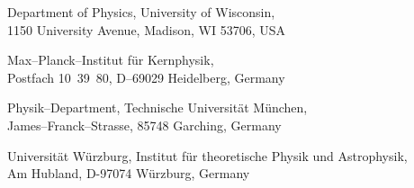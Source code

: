 \documentclass[12pt,a4paper]{article}
\newcommand{\GLOBES}{{\sf GLoBES}}
\newcommand{\GLOBESN}{{\sf GLoBES~3.0}}
\begin{document}
\begin{titlepage}
{\begin{center}
\footnotemark[1]%
       Department of Physics, University of Wisconsin, \\
       1150 University Avenue, Madison, WI 53706, USA

\vspace*{1mm}

\footnotemark[2]%
       Max--Planck--Institut f\"ur Kernphysik,  \\
       Postfach 10~39~80, D--69029 Heidelberg, Germany 

\vspace*{1mm}

\footnotemark[3]%
       Physik--Department, Technische Universit\"at M\"unchen, \\
       James--Franck--Strasse, 85748 Garching, Germany

\vspace*{1mm}

\footnotemark[4]%
       Universit\"at W\"urzburg, 
       Institut f\"ur theoretische Physik und Astrophysik, \\
       Am Hubland, D-97074 W\"urzburg, Germany

\end{center}}

\vspace*{1cm}


\begin{abstract}
We present Version 3.0 of the GLoBES (``General Long Baseline Experiment Simulator'') software, which is
a simulation tool for short- and long-baseline neutrino oscillation experiments. As new features, \GLOBESN\ allows the simulation of experiments with multiple discrete sources and detectors by the 
concept of user-defined systematics.
In addition, the combination with external information, such as from different experiment classes, is 
simplified by the concept of user-defined priors. As far as the probability calculation is concerned, \GLOBES\ 
now provides an interface for the inclusion of non-standard physics without re-compliation of the software. 
The set of experiment descriptions coming with \GLOBES\ has been updated. For example, built-in fluxes are now
provided for the simulation of beta beams.
\end{abstract}


\vspace*{.5cm}


\end{titlepage}

\newpage

\renewcommand{\thefootnote}{\arabic{footnote}}
\setcounter{footnote}{0}
\end{document}
